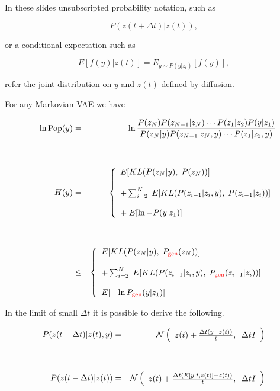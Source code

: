{In these slides unsubscripted probability notation, such as

\vfill
$$P(z(t+\Delta t)|z(t)),$$

\vfill
or a conditional expectation such as

\vfill
$$E[f(y)|z(t)] = E_{y \sim P(y|z_t)}[f(y)],$$

\vfill
refer the joint distribution on $y$ and $z(t)$ defined by diffusion.


For any Markovian VAE we have

\vfill
{\Large
\begin{eqnarray}
  - \ln \mathrm{Pop}(y) & = & - \ln\frac{P(z_N)P(z_{N-1}|z_N)\cdots P(z_1|z_2)P(y|z_1)}{P(z_N|y)P(z_{N-1}|z_N,y)\cdots P(z_1|z_2,y)} \nonumber\\
  \nonumber \\
  \nonumber \\
  H(y) & = & \left\{\begin{array}{l} E[KL(P(z_N|y),\;P(z_N))] \\ \\ + \sum_{i=2}^N  \; E[KL(P(z_{i-1}|z_i,y),\;P(z_{i-1}|z_i))] \\ \\ +\;E[\ln -P(y|z_1)] \end{array}\right. \label{Markov-eq} \\
  \nonumber\\
  \nonumber\\
  & \leq & \left\{\begin{array}{l} E[KL(P(z_N|y),\;P_{\color{red} \mathrm{gen}}(z_N))] \\ \\ + \sum_{i=2}^N  \; E[KL(P(z_{i-1}|z_i,y),\;P_{\color{red} \mathrm{gen}}(z_{i-1}|z_i))] \\ \\ E[- \ln P_{\color{red} \mathrm{gen}}(y|z_1)] \end{array}\right. \;\;\;~\label{Markov-ELBO}
\end{eqnarray}
}


In the limit of small $\Delta t$ it is possible to derive the following.

\begin{eqnarray*}
  P(z(t - \Delta t)|z(t),y) & = & {\cal N}\left(\begin{array}{l}z(t) + \frac{\Delta t(y - z(t))}{t},\;\; \Delta t I\end{array}\right) \\
  \\
  \\
  P(z(t - \Delta t)|z(t)) & = & {\cal N}\left(\begin{array}{l} z(t) + \frac{\Delta t(E[y|t,z(t)] - z(t))}{t}, \;\; \Delta t I\end{array}\right)
\end{eqnarray*}


}
